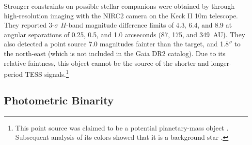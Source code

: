 \documentclass[12pt,twocolumn,tighten,trackchanges]{aastex62}
\begin{document}
Stronger constraints on possible stellar companions were obtained by
\citet{van_eyken_ptf_2012} through high-resolution imaging with the
NIRC2 camera on the Keck II 10m telescope.  They reported 3-$\sigma$
$H$-band magnitude difference limits of 4.3, 6.4, and 8.9 at angular
separations of 0.25, 0.5, and 1.0 arcseconds (87, 175, and 349~AU).
They also detected a point source 7.0 magnitudes fainter than the
target, and 1.8$''$ to the north-east (which is not included in the
Gaia DR2 catalog). Due to its relative faintness, this object cannot
be the source of the shorter and longer-period TESS
signals.\footnote{This point source was claimed to be a potential
planetary-mass object \citep{schmidt_direct_2016}.  Subsequent
analysis of its colors showed that it is a background star
\citep{lee_evidence_2018}.} 


\subsection{Photometric Binarity}
\end{document}
